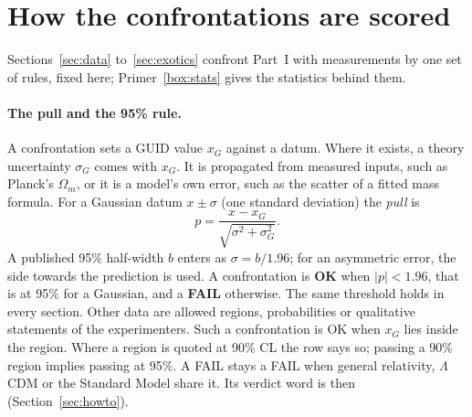 \section{How the confrontations are scored}\label{sec:scoring}

Sections~\ref{sec:data} to~\ref{sec:exotics} confront Part~I with measurements by one set of rules, fixed here; Primer~\ref{box:stats} gives
the statistics behind them.



\paragraph{The pull and the 95\% rule.} A confrontation sets a GUID value $x_G$ against a datum. Where it exists, a theory uncertainty
$\sigma_G$ comes with $x_G$. It is propagated from measured inputs, such as Planck's $\Omega_m$, or it is a model's own error, such as the
scatter of a fitted mass formula. For a Gaussian datum $x\pm\sigma$ (one standard deviation) the \emph{pull} is
\begin{equation}\label{eq:pull}
p=\frac{x-x_G}{\sqrt{\sigma^2+\sigma_G^2}} .
\end{equation}
A published 95\% half-width $b$ enters as $\sigma=b/1.96$; for an asymmetric error, the side towards the prediction is used. A confrontation
is \textbf{OK} when $|p|<1.96$, that is at 95\% for a Gaussian, and a \textbf{FAIL} otherwise. The same threshold holds in every section.
Other data are allowed regions, probabilities or qualitative statements of the experimenters. Such a confrontation is OK when $x_G$ lies
inside the region. Where a region is quoted at 90\% CL the row says so; passing a 90\% region implies passing at 95\%. A FAIL stays a FAIL
when general relativity, $\Lambda$CDM or the Standard Model share it. Its verdict word is then  (Section~\ref{sec:howto}).

